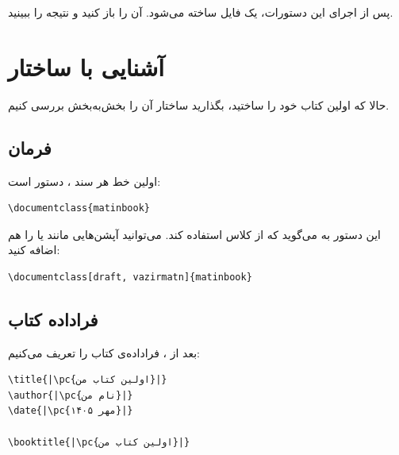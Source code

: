 
پس از اجرای این دستورات، یک فایل
 ساخته می‌شود. آن را باز
کنید و نتیجه را ببینید.


\section{آشنایی با ساختار}
\label{sec:first-book-tour}

حالا که اولین کتاب خود را ساختید، بگذارید
ساختار آن را بخش‌به‌بخش بررسی کنیم.

\subsection{فرمان }
\label{sec:first-book-documentclass}

اولین خط هر سند ، دستور
 است:

\begin{latin}
\begin{verbatim}
\documentclass{matinbook}
\end{verbatim}
\end{latin}

این دستور به  می‌گوید که از کلاس
 استفاده کند. می‌توانید آپشن‌هایی
مانند  یا  را هم اضافه
کنید:

\begin{latin}
\begin{verbatim}
\documentclass[draft, vazirmatn]{matinbook}
\end{verbatim}
\end{latin}


\subsection{فراداده کتاب}
\label{sec:first-book-metadata}

بعد از ، فراداده‌ی کتاب را
تعریف می‌کنیم:

\begin{latin}
\begin{verbatim}
\title{|\pc{اولین کتاب من}|}
\author{|\pc{نام من}|}
\date{|\pc{مهر ۱۴۰۵}|}

\booktitle{|\pc{اولین کتاب من}|}
\end{verbatim}
\end{latin}

